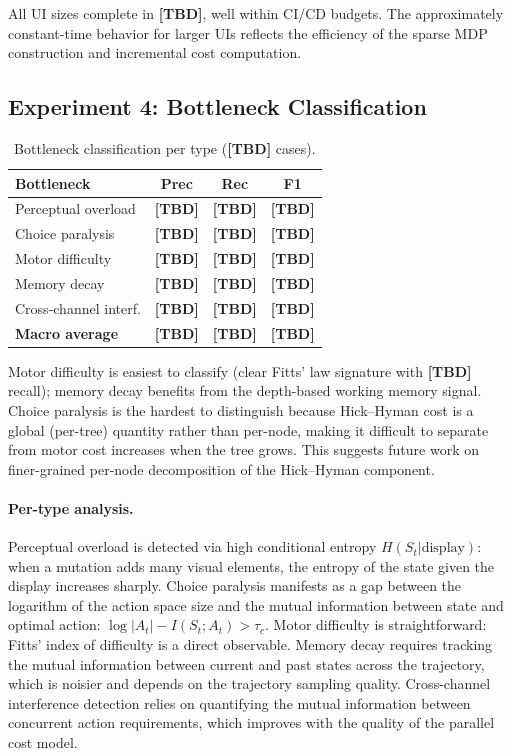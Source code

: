 \documentclass[11pt,twocolumn]{article}
\theoremstyle{definition}
\begin{document}
All UI sizes complete in \textbf{[TBD]}, well within CI/CD budgets.
The approximately constant-time behavior for larger UIs reflects the efficiency of the sparse MDP construction and incremental cost computation.

\subsection{Experiment 4: Bottleneck Classification}

\begin{table}[t]
\centering
\caption{Bottleneck classification per type (\textbf{[TBD]} cases).}
\label{tab:bottleneck}
\small
\begin{tabular}{@{}lccc@{}}
\toprule
\textbf{Bottleneck} & \textbf{Prec} & \textbf{Rec} & \textbf{F1} \\
\midrule
Perceptual overload    & \textbf{[TBD]} & \textbf{[TBD]} & \textbf{[TBD]} \\
Choice paralysis       & \textbf{[TBD]} & \textbf{[TBD]} & \textbf{[TBD]} \\
Motor difficulty       & \textbf{[TBD]} & \textbf{[TBD]} & \textbf{[TBD]} \\
Memory decay           & \textbf{[TBD]} & \textbf{[TBD]} & \textbf{[TBD]} \\
Cross-channel interf.  & \textbf{[TBD]} & \textbf{[TBD]} & \textbf{[TBD]} \\
\midrule
\textbf{Macro average} & \textbf{[TBD]} & \textbf{[TBD]} & \textbf{[TBD]} \\
\bottomrule
\end{tabular}
\end{table}

Motor difficulty is easiest to classify (clear Fitts' law signature with \textbf{[TBD]} recall); memory decay benefits from the depth-based working memory signal.
Choice paralysis is the hardest to distinguish because Hick--Hyman cost is a global (per-tree) quantity rather than per-node, making it difficult to separate from motor cost increases when the tree grows.
This suggests future work on finer-grained per-node decomposition of the Hick--Hyman component.

\paragraph{Per-type analysis.}
Perceptual overload is detected via high conditional entropy $H(S_t | \text{display})$: when a mutation adds many visual elements, the entropy of the state given the display increases sharply.
Choice paralysis manifests as a gap between the logarithm of the action space size and the mutual information between state and optimal action: $\log|A_t| - I(S_t; A_t) > \tau_c$.
Motor difficulty is straightforward: Fitts' index of difficulty is a direct observable.
Memory decay requires tracking the mutual information between current and past states across the trajectory, which is noisier and depends on the trajectory sampling quality.
Cross-channel interference detection relies on quantifying the mutual information between concurrent action requirements, which improves with the quality of the parallel cost model.
\end{document}
